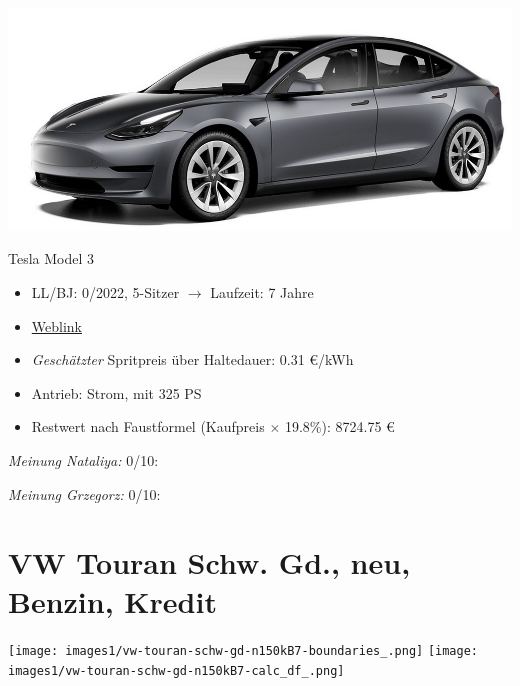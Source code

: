 \documentclass[landscape, DIV=99, 14pt]{scrartcl}
\begin{document}
\pagebreak
\begin{center}
\includegraphics[width=0.9\columnwidth]{cars/tesla-model-3.jpg}

Tesla Model 3
\end{center}

\begin{itemize}
    \item LL/BJ: 0/2022, 5-Sitzer $\rightarrow$ Laufzeit: 7 Jahre
    \item \href{https://www.tesla.com/de_de/model3/design\#overview}{Weblink}
    \item \emph{Gesch\"atzter} Spritpreis \"uber Haltedauer: 0.31 \euro{}/kWh
    \item Antrieb: Strom, mit 325 PS
    \item Restwert nach Faustformel (Kaufpreis $\times$ 19.8\%): 8724.75 \euro{}
\end{itemize}

\begin{small}
\emph{Meinung Nataliya:} 0/10: 
        
\emph{Meinung Grzegorz:} 0/10: 
\end{small}

\pagebreak


\twocolumn

\section*{VW Touran Schw. Gd., neu, Benzin, Kredit}
\begin{center}
\texttt{[image: images1/vw-touran-schw-gd-n150kB7-boundaries\_.png]}
\null
\vspace{0.5cm}
\texttt{[image: images1/vw-touran-schw-gd-n150kB7-calc\_df\_.png]}
\end{center}
\end{document}
